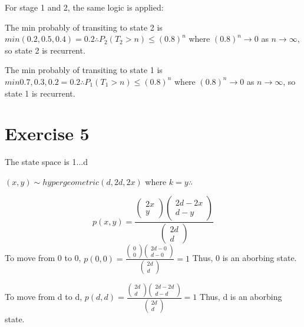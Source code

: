 \documentclass{article}\usepackage[]{graphicx}\usepackage[]{color}
\begin{document}
For stage 1 and 2, the same logic is applied:

The min probably of transiting to state 2 is $min(0.2, 0.5,0.4)=0.2\therefore P_{2}(T_{2}>n)\leq (0.8)^{n}$ where
$(0.8)^{n} \rightarrow 0$ as $n \rightarrow \infty$, so state 2 is recurrent.

The min probably of transiting to state 1 is $min{0.7, 0.3,0.2}=0.2\therefore P_{1}(T_{1}>n)\leq (0.8)^{n}$ where
$(0.8)^{n} \rightarrow 0$ as $n \rightarrow \infty$, so state 1 is recurrent.

\section*{Exercise 5}
The state space is {1...d}

$(x,y)\sim hypergeometric(d, 2d, 2x)$ where $k = y \therefore$

\begin{equation}
p(x,y) = \frac{\left(\begin{array}{c}
2x\\
y
\end{array}\right)\left(\begin{array}{c}
2d-2x\\
d-y
\end{array}\right)}{\left(\begin{array}{c}
2d\\
d
\end{array}\right)}
\end{equation}
To move from 0 to 0,
$p(0,0) = \frac{\left(\begin{array}{c}
0\\
0
\end{array}\right)\left(\begin{array}{c}
2d-0\\
d-0
\end{array}\right)}{\left(\begin{array}{c}
2d\\
d
\end{array}\right)} = 1$
Thus, 0 is an aborbing state.


To move from d to d,
$p(d,d) = \frac{\left(\begin{array}{c}
2d\\
d
\end{array}\right)\left(\begin{array}{c}
2d-2d\\
d-d
\end{array}\right)}{\left(\begin{array}{c}
2d\\
d
\end{array}\right)} = 1$
Thus, d is an aborbing state.
\end{document}
